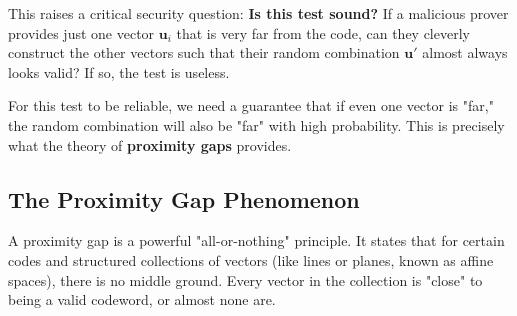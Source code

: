 \documentclass{article}
\begin{document}
This raises a critical security question: \textbf{Is this test sound?} If a malicious prover provides just one vector $\mathbf{u}_i$ that is very far from the code, can they cleverly construct the other vectors such that their random combination $\mathbf{u}'$ almost always looks valid? If so, the test is useless.

For this test to be reliable, we need a guarantee that if even one vector is "far," the random combination will also be "far" with high probability. This is precisely what the theory of \textbf{proximity gaps} provides.

\subsection{The Proximity Gap Phenomenon}
A proximity gap is a powerful "all-or-nothing" principle. It states that for certain codes and structured collections of vectors (like lines or planes, known as affine spaces), there is no middle ground. Every vector in the collection is "close" to being a valid codeword, or almost none are.
\end{document}
